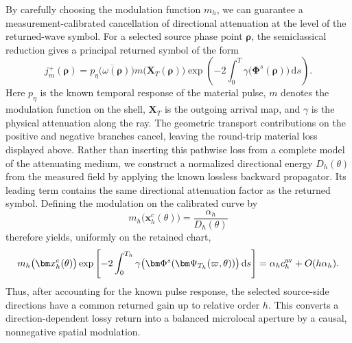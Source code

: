 \documentclass[11pt,reqno]{amsart}
\newcommand{\dd}{\,\mathrm{d}}
\numberwithin{equation}{section}
\begin{document}
By carefully choosing the modulation function $m_h$, we can guarantee a measurement-calibrated cancellation of directional attenuation at the level of the returned-wave symbol. For a selected source phase point $\bm\rho$, the semiclassical reduction gives a principal returned symbol of the form
\begin{equation*}
 j_m^+(\bm\rho) = \overline{p_\eta\bigl(\omega(\bm\rho)\bigr)}m\bigl(\bm X_T(\bm\rho)\bigr)
 \exp\left(-2\int_0^T\gamma\bigl(\bm\Phi^s(\bm\rho)\bigr)\dd s\right).
\end{equation*}
Here $p_\eta$ is the known temporal response of the material pulse, $m$ denotes the modulation function on the shell, $\bm X_T$ is the outgoing arrival map, and $\gamma$ is the physical attenuation along the ray. The geometric transport contributions on the positive and negative branches cancel, leaving the round-trip material loss displayed above. Rather than inserting this pathwise loss from a complete model of the attenuating medium, we construct a normalized directional energy $D_h(\theta)$ from the measured field by applying the known lossless backward propagator. Its leading term contains the same directional attenuation factor as the returned symbol. Defining the modulation on the calibrated curve by
\begin{equation*}
 m_h\bigl(\bm x_h^c(\theta)\bigr)=\frac{\alpha_h}{D_h(\theta)}
\end{equation*}
therefore yields, uniformly on the retained chart,
\begin{equation*}
 m_h\bigl(\bm x_h^c(\theta)\bigr)\exp\left[-2\int_0^{T_h}\gamma\bigl(\bm\Phi^s(\bm\Psi_{T_h}(\varpi,\theta))\bigr)\dd s\right]=\alpha_h c_h^{\rm av}+O(h\alpha_h).
\end{equation*}
Thus, after accounting for the known pulse response, the selected source-side directions have a common returned gain up to relative order $h$. This converts a direction-dependent lossy return into a balanced microlocal aperture by a causal, nonnegative spatial modulation.
\end{document}
